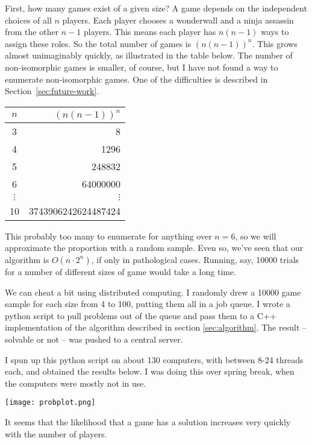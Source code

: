 \documentclass[12pt,x11names, rgb]{article}
\begin{document}
    First, how many games exist of a given size? A game depends on the independent choices of all $n$ players. Each player chooses a wonderwall and a ninja assassin from the other $n-1$ players. This means each player has $n(n-1)$ ways to assign these roles. So the total number of games is $\displaystyle \left(n(n-1)\right)^n$. This grows almost unimaginably quickly, as illustrated in the table below. The number of non-isomorphic games is smaller, of course, but I have not found a way to enumerate non-isomorphic games. One of the difficulties is described in Section~\ref{sec:future-work}.
    \begin{center}
        \begin{tabular}{c | r}
        $n$ & $\displaystyle \left(n(n-1)\right)^n$\\
        \hline
        3 & 8\\
        4 & 1296 \\
        5 & 248832 \\
        6 & 64000000\\
        $\vdots$ & $\vdots$ \\
        10 & 3743906242624487424
        \end{tabular}
    \end{center}
    This probably too many to enumerate for anything over $n=6$, so we will approximate the proportion with a random sample. Even so, we've seen that our algorithm is $O(n\cdot 2^n)$, if only in pathological cases. Running, say, 10000 trials for a number of different sizes of game would take a long time.

    We can cheat a bit using distributed computing. I randomly drew a 10000 game sample for each size from 4 to 100, putting them all in a job queue. I wrote a python script to pull problems out of the queue and pass them to a C++ implementation of the algorithm described in section \ref{sec:algorithm}. The result -- solvable or not -- was pushed to a central server. 

    I spun up this python script on about 130 computers, with between 8-24 threads each, and obtained the results below. I was doing this over spring break, when the computers were mostly not in use.

    \begin{center}
    \texttt{[image: probplot.png]}
    \end{center}

    It seems that the likelihood that a game has a solution increases very quickly with the number of players.
\end{document}
